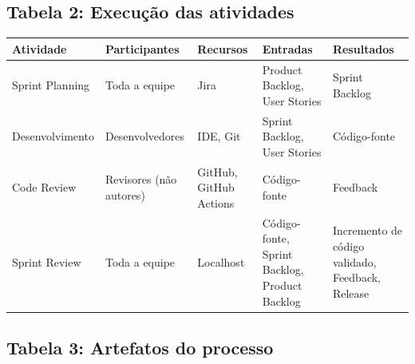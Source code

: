 \documentclass[12pt,a4paper]{article}
\begin{document}
\subsection*{Tabela 2: Execução das atividades}
\begin{table}[H]
\centering
\begin{tabularx}{\textwidth}{|l|l|X|X|X|}
\hline
\textbf{Atividade} & \textbf{Participantes} & \textbf{Recursos} & \textbf{Entradas} & \textbf{Resultados} \\ \hline
Sprint Planning & Toda a equipe & Jira & Product Backlog, User Stories & Sprint Backlog \\ \hline %
Desenvolvimento & Desenvolvedores & IDE, Git & Sprint Backlog, User Stories & Código-fonte \\ \hline
Code Review & Revisores (não autores) & GitHub, GitHub Actions & Código-fonte & Feedback \\ \hline
Sprint Review & Toda a equipe & Localhost & Código-fonte, Sprint Backlog, Product Backlog & Incremento de código validado, Feedback, Release \\ \hline
\end{tabularx}
\end{table}

\subsection*{Tabela 3: Artefatos do processo}
\end{document}
